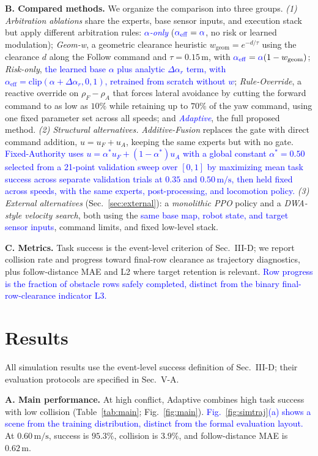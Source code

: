 \documentclass[letterpaper, 10 pt, conference]{ieeeconf}
\newcommand{\uF}{u_{F}}
\newcommand{\uA}{u_{A}}
\newcommand{\alphaeff}{\alpha_{\mathrm{eff}}}
\newcommand{\rFdir}{\rho_F}
\newcommand{\rAdir}{\rho_A}
\newcommand{\darisk}{\Delta \alpha_r}
\newcommand{\msec}{\,\mathrm{m/s}}
\newcommand{\rev}[1]{\textcolor{blue}{#1}}
\begin{document}
\textbf{B. Compared methods.}
We organize the comparison into three groups.
\emph{(1) Arbitration ablations} share the experts, base sensor inputs, and
execution stack but apply different arbitration rules:
\emph{\rev{$\alpha$-only}} ($\rev{\alphaeff}=\rev{\alpha}$, no risk or learned modulation);
\emph{Geom-w}, a geometric clearance heuristic
$w_{\mathrm{geom}}=e^{-d/\tau}$ using the clearance $d$ along the Follow command and
$\tau=0.15\,\mathrm{m}$, with $\rev{\alphaeff}=\rev{\alpha}(1-w_{\mathrm{geom}})$;
\emph{Risk-only}, \rev{the learned base $\alpha$ plus analytic $\darisk$ term, with $\alpha_{\mathrm{eff}}=\mathrm{clip}(\alpha+\Delta\alpha_r,0,1)$, retrained from
scratch without $w$}; \emph{Rule-Override}, a reactive
override on $\rFdir-\rAdir$ that forces lateral avoidance by cutting the forward
command to as low as $10\%$ while retaining up to $70\%$ of the yaw
command, using one fixed parameter set across all speeds; and
\emph{\rev{Adaptive}}, the full proposed method.
\emph{(2) Structural alternatives.} \emph{Additive-Fusion} replaces the
gate with direct command addition, $u=\uF+\uA$, keeping the same experts
but with no gate. \rev{Fixed-Authority uses
$u=\alpha^*\uF+(1-\alpha^*)\uA$ with a global constant
$\alpha^*=0.50$ selected from a 21-point validation sweep over $[0,1]$ by maximizing mean task success across separate validation trials at $0.35$ and $0.50\msec$, then held fixed across speeds, with the same experts, post-processing, and locomotion policy.}
\emph{(3) External alternatives} (Sec.~\ref{sec:external}): a \emph{monolithic PPO} policy and a \emph{DWA-style velocity search}, both using the \rev{same base map, robot state, and target sensor inputs}, command limits, and fixed low-level stack.

\textbf{C. Metrics.}
Task success is the event-level criterion of Sec.~III-D; we report collision
rate and progress toward final-row clearance as trajectory diagnostics,
plus follow-distance MAE and L2 where target retention is relevant. \rev{Row progress is the fraction of obstacle rows safely completed, distinct from the binary final-row-clearance indicator L3.}

\section{Results}
\label{sec:results}
All simulation results use the event-level success definition of
Sec.~III-D; their evaluation protocols are specified in Sec.~V-A.

\textbf{A. Main performance.}
At high conflict, Adaptive combines high task success with low collision (Table~\ref{tab:main}; Fig.~\ref{fig:main}). \rev{Fig.~\ref{fig:simtraj}(a) shows a scene from the training distribution, distinct from the formal evaluation layout.} At $0.60\msec$, success is $95.3\%$, collision is $3.9\%$, and follow-distance MAE is $0.62\,\mathrm{m}$.
\end{document}
